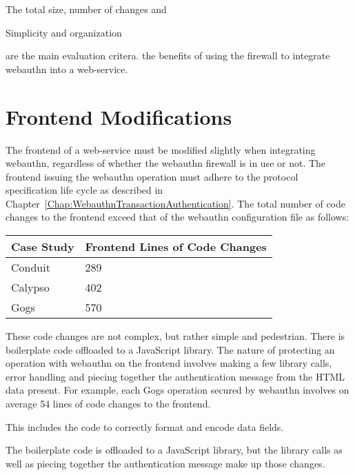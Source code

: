 The total size, number of changes and 

Simplicity and organization

 are the main evaluation critera.
the benefits of using the firewall to integrate webauthn into a web-service. 
\fi

\section{Frontend Modifications}

The frontend of a web-service must be modified slightly when integrating webauthn, regardless of whether the webauthn firewall is in use or not. The frontend issuing the webauthn operation must adhere to the protocol specification life cycle as described in Chapter~\ref{Chap:WebauthnTransactionAuthentication}. The total number of code changes to the frontend exceed that of the webauthn configuration file as follows:

\begin{table}[h]
\centering

\begin{tabular}{ m{4.5cm} m{6cm}  } 
 \hline
 Case Study & Frontend Lines of Code Changes \\ 
 \hline \hline

 Conduit & 289 \\ \hline

 Calypso & 402 \\ \hline

 Gogs & 570 \\ \hline

\end{tabular}
\end{table}

These code changes are not complex, but rather simple and pedestrian. There is boilerplate code offloaded to a JavaScript library. The nature of protecting an operation with webauthn on the frontend involves making a few library calls, error handling and piecing together the authentication message from the HTML data present. For example, each Gogs operation secured by webauthn involves on average 54 lines of code changes to the frontend. 

\iffalse
This includes the code to correctly format and encode data fields.

The boilerplate code is offloaded to a JavaScript library, but the library calls as well as piecing together the authentication message make up those changes.


